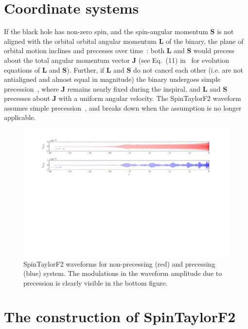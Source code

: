 \section{Coordinate systems}
If the black hole has non-zero spin, and the spin-angular momentum $\mathbf{S}$
is  not aligned with the orbital orbital angular momentum $\mathbf{L}$ of the
binary, the plane of orbital motion inclines and precesses over
time~\cite{Apostolatos1994}: both $\mathbf{L}$ and $\mathbf{S}$  would precess
about the total angular momentum vector $\mathbf{J}$ (see Eq.~(11)
in~\cite{Apostolatos1994} for evolution equations of $\mathbf{L}$ and
$\mathbf{S}$). Further, if $\mathbf{L}$ and $\mathbf{S}$ do not cancel each
other (i.e. are not antialigned and almost equal in magnitude)  the binary
undergoes simple precession~\cite{Apostolatos1994}, where $\mathbf{J}$ remains
nearly fixed during the inspiral, and $\mathbf{L}$ and $\mathbf{S}$ precesses
about $\mathbf{J}$ with a uniform angular velocity. The SpinTaylorF2 waveform
assumes simple precession~\cite{Lundgren2014}, and breaks down  when the
assumption is no longer applicable.
\label{fig:waveforms} 
\begin{figure}[t]
\includegraphics[width=\textwidth]{./images/TD_waveforms_comparison.pdf}
\caption{SpinTaylorF2 waveforms for non-precessing (red) and precessing (blue) system. 
The modulations in the waveform amplitude due to precession is clearly visible in the 
bottom figure.} 
\centering 
\end{figure}

\section{The construction of SpinTaylorF2}

